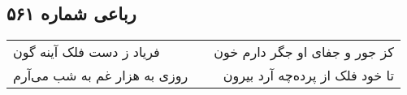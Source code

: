 \begin{center}
\section*{رباعی شماره ۵۶۱}
\label{sec:sh561}
\begin{longtable}{l p{0.5cm} r}
فریاد ز دست فلک آینه گون
&&
کز جور و جفای او جگر دارم خون
\\
روزی به هزار غم به شب می‌آرم
&&
تا خود فلک از پرده‌چه آرد بیرون
\\
\end{longtable}
\end{center}
